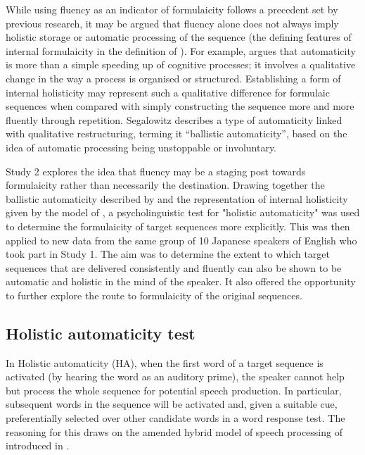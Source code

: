 \documentclass[output=paper]{langscibook}
\begin{document}
While using fluency as an indicator of formulaicity follows a precedent set by previous research, it may be argued that fluency alone does not always imply holistic storage or automatic processing of the sequence (the defining features of internal formulaicity in the definition of \citealt{MylesCordier2017}). For example, \citet{Segalowitz2010} argues that automaticity is more than a simple speeding up of cognitive processes; it involves a qualitative change in the way a process is organised or structured. Establishing a form of internal holisticity may represent such a qualitative difference for formulaic sequences when compared with simply constructing the sequence more and more fluently through repetition. Segalowitz describes a type of automaticity linked with qualitative restructuring, terming it ``ballistic automaticity'', based on the idea of automatic processing being unstoppable or involuntary. 

Study 2 explores the idea that fluency may be a staging post towards formulaicity rather than necessarily the destination. Drawing together the ballistic automaticity described by \citet{Segalowitz2010} and the representation of internal holisticity given by the model of \citet{SprengerEtAl2006}, a psycholinguistic test for "holistic automaticity" was used to determine the formulaicity of target sequences more explicitly. This was then applied to new data from the same group of 10 Japanese speakers of English who took part in Study 1. The aim was to determine the extent to which target sequences that are delivered consistently and fluently can also be shown to be automatic and holistic in the mind of the speaker. It also offered the opportunity to further explore the route to formulaicity of the original sequences. 

\subsection{Holistic automaticity test}\label{sec:cutler:3.2}

In Holistic automaticity (HA), when the first word of a target sequence is activated (by hearing the word as an auditory prime), the speaker cannot help but process the whole sequence for potential speech production. In particular, subsequent words in the sequence will be activated and, given a suitable cue, preferentially selected over other candidate words in a word response test. The reasoning for this draws on the amended hybrid model of speech processing of \citet{SprengerEtAl2006} introduced in .
\end{document}

